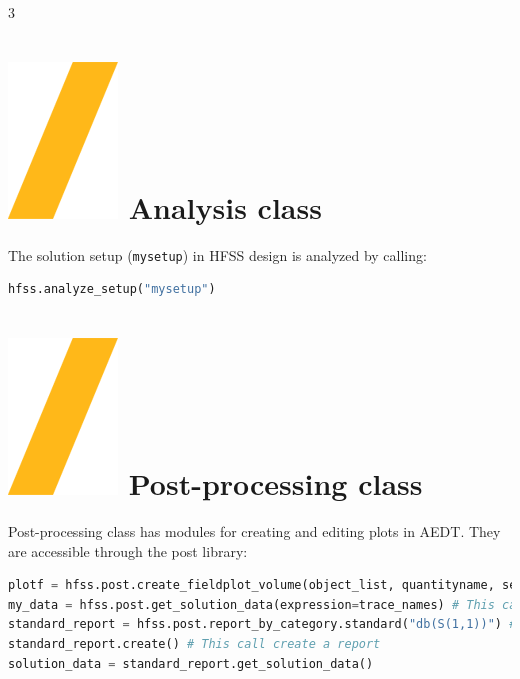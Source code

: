 \documentclass[9pt,landscape]{article}
\begin{document}
\begin{multicols}{3}
\section{\includegraphics[height=\fontcharht\font`\S]{slash.png} Analysis class}
The solution setup (\texttt{mysetup}) in HFSS design is analyzed by calling:
\begin{lstlisting}[language=Python]
hfss.analyze_setup("mysetup")
\end{lstlisting}
\section{\includegraphics[height=\fontcharht\font`\S]{slash.png} Post-processing class}
Post-processing class has modules for creating and editing plots in AEDT. They are accessible through the post library:
\begin{lstlisting}[language=Python]
plotf = hfss.post.create_fieldplot_volume(object_list, quantityname, setup_name, intrinsic_dict) # This call returns a FieldPlot object
my_data = hfss.post.get_solution_data(expression=trace_names) # This call returns a Solution Data object
standard_report = hfss.post.report_by_category.standard("db(S(1,1))") # This call returns a new standard report object
standard_report.create() # This call create a report
solution_data = standard_report.get_solution_data()
\end{lstlisting}


\end{multicols}
\end{document}
